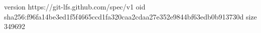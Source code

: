 version https://git-lfs.github.com/spec/v1
oid sha256:f96fa14be3ed1f5f4665ccd1fa320caa2cdaa27e352e9844bf63edb0b913730d
size 349692
